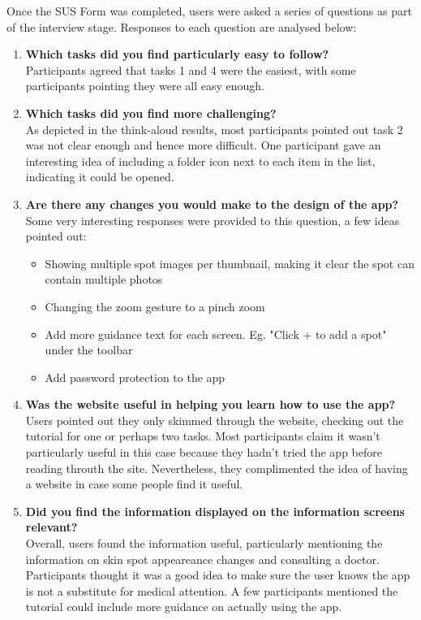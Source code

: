 Once the SUS Form was completed, users were asked a series of questions as part of the interview stage. Responses to each question are analysed below:
\begin{enumerate}
    \item \textbf{Which tasks did you find particularly easy to follow?}
    \\Participants agreed that tasks 1 and 4 were the easiest, with some participants pointing they were all easy enough.
    \item \textbf{Which tasks did you find more challenging?}
    \\As depicted in the think-aloud results, most participants pointed out task 2 was not clear enough and hence more difficult. One participant gave an interesting idea of including a folder icon next to each item in the list, indicating it could be opened.
    \item \textbf{Are there any changes you would make to the design of the app?}
    \\Some very interesting responses were provided to this question, a few ideas pointed out:
    \begin{itemize}
        \item Showing multiple spot images per thumbnail, making it clear the spot can contain multiple photos
        \item Changing the zoom gesture to a pinch zoom
        \item Add more guidance text for each screen. Eg. "Click + to add a spot" under the toolbar
        \item Add password protection to the app
    \end{itemize}
    \item \textbf{Was the website useful in helping you learn how to use the app?}
    \\ Users pointed out they only skimmed through the website, checking out the tutorial for one or perhaps two tasks. Most participants claim it wasn't particularly useful in this case because they hadn't tried the app before reading throuth the site. Nevertheless, they complimented the idea of having a website in case some people find it useful.
    \item \textbf{Did you find the information displayed on the information screens relevant?}
    \\ Overall, users found the information useful, particularly mentioning the information on skin spot appeareance changes and consulting a doctor. Participants thought it was a good idea to make sure the user knows the app is not a substitute for medical attention. A few participants mentioned the tutorial could include more guidance on actually using the app.
\end{enumerate}